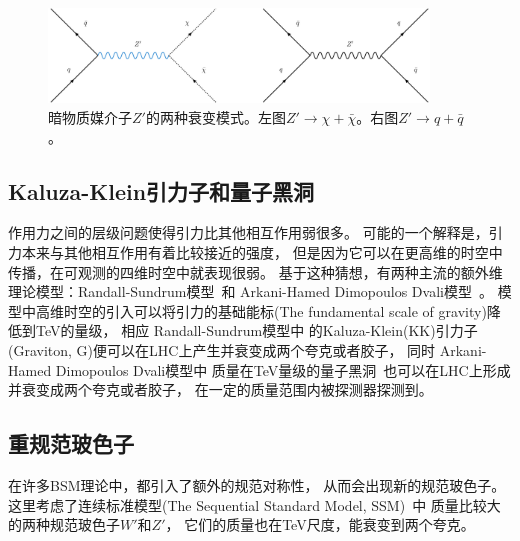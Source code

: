 \begin{figure}
  \begin{center}
    \includegraphics[width=0.9\textwidth]{figuresTHE/ZChl.pdf}
  \end{center}
  \caption{
暗物质媒介子$Z'$的两种衰变模式。左图$Z'\rightarrow \chi+\bar{\chi}$。右图$Z'\rightarrow q+\bar{q}$。
}
    \label{fig:ZChl}
\end{figure}

\subsection{Kaluza-Klein引力子和量子黑洞}
\label{sec:KKG}
作用力之间的层级问题使得引力比其他相互作用弱很多。
可能的一个解释是，引力本来与其他相互作用有着比较接近的强度，
但是因为它可以在更高维的时空中传播，在可观测的四维时空中就表现很弱。
基于这种猜想，有两种主流的额外维理论模型：Randall-Sundrum模型~\cite{RS1,RS2}和
Arkani-Hamed Dimopoulos Dvali模型~\cite{ADD}。
模型中高维时空的引入可以将引力的基础能标(The fundamental scale of gravity)降低到TeV的量级，
相应
Randall-Sundrum模型中
的Kaluza-Klein(KK)引力子(Graviton, G)便可以在LHC上产生并衰变成两个夸克或者胶子，
同时
Arkani-Hamed Dimopoulos Dvali模型中
质量在TeV量级的量子黑洞~\cite{qbh1,qbh2}也可以在LHC上形成并衰变成两个夸克或者胶子，
在一定的质量范围内被探测器探测到。



\subsection{重规范玻色子}
\label{sec:WZPrime}
在许多BSM理论中，都引入了额外的规范对称性，
从而会出现新的规范玻色子。
这里考虑了连续标准模型(The Sequential Standard Model, SSM)~\cite{zprime1,zprime3,wprime1}中
质量比较大的两种规范玻色子$W'$和$Z'$，
它们的质量也在TeV尺度，能衰变到两个夸克。


